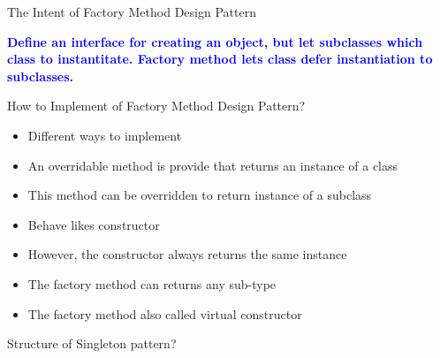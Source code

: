 \documentclass[13pt]{beamer}
\begin{document}
\begin{frame}{The Intent of Factory Method Design Pattern}
	\begin{center}
	\textcolor{blue}{\textbf{Define an interface for creating an object, but let subclasses which class to instantitate. Factory method lets class defer instantiation to subclasses.}}
	\end{center}
\end{frame}

\begin{frame}{How to Implement of Factory Method Design Pattern?}
	\begin{itemize}
		\setlength\itemsep{1em}
		\item Different ways to implement
		\item An overridable method is provide that returns an instance of a class
		\item This method can be overridden to return instance of a subclass
		\item Behave likes constructor
		\item However, the constructor always returns the same instance
		\item The factory method can returns any sub-type 
		\item The factory method also called virtual constructor 
	\end{itemize}
\end{frame}

\begin{frame}{Structure of Singleton pattern?}
	\begin{center}
	\end{center}
\end{frame}
\end{document}
